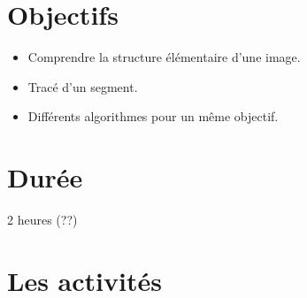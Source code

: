 \documentclass[class=report,crop=false, 12pt]{standalone}
\begin{document}



\section*{Objectifs}

\begin{itemize}
  \item Comprendre la structure élémentaire d'une image.
  \item Tracé d'un segment.
  \item Différents algorithmes pour un même objectif.
\end{itemize}


\section*{Durée}

2 heures (??)

\section*{Les activités}
\end{document}
